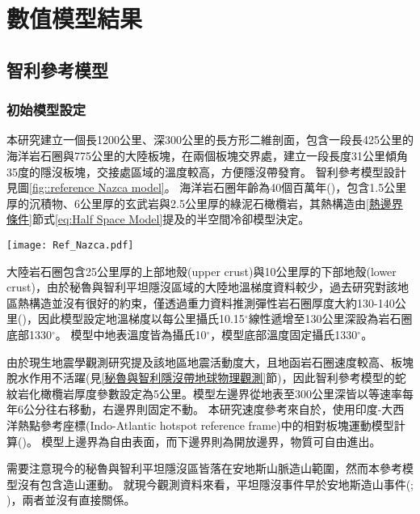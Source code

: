 
\chapter{數值模型結果}

\section{智利參考模型}
\subsection{初始模型設定}\label{智利參考模型初始模型設定}
本研究建立一個長1200公里、深300公里的長方形二維剖面，包含一段長425公里的海洋岩石圈與775公里的大陸板塊，在兩個板塊交界處，建立一段長度31公里傾角35度的隱沒板塊，交接處區域的溫度較高，方便隱沒帶發育。
智利參考模型設計見圖\ref{fig::reference Nazca model}。
海洋岩石圈年齡為40個百萬年(\citealp{muller2019})，包含1.5公里厚的沉積物、6公里厚的玄武岩與2.5公里厚的綠泥石橄欖岩，其熱構造由\ref{熱邊界條件}節式\ref{eq:Half Space Model}提及的半空間冷卻模型決定。

\begin{figure*}[hb]
    \centering
    \texttt{[image: Ref\_Nazca.pdf]}
    \caption[智利參考模型設計與邊界條件示意圖]{智利參考模型設計與邊界條件示意圖}
    \label{fig::reference Nazca model}
\end{figure*}

大陸岩石圈包含25公里厚的上部地殼(upper crust)與10公里厚的下部地殼(lower crust)，由於秘魯與智利平坦隱沒區域的大陸地溫梯度資料較少，過去研究對該地區熱構造並沒有很好的約束，僅透過重力資料推測彈性岩石圈厚度大約130-140公里(\citealp{perez2008})，因此模型設定地溫梯度以每公里攝氏10.15$^{\circ}$線性遞增至130公里深設為岩石圈底部1330$^{\circ}$。
模型中地表溫度皆為攝氏10$^{\circ}$，模型底部溫度固定攝氏1330$^{\circ}$。

由於現生地震學觀測研究提及該地區地震活動度大，且地函岩石圈速度較高、板塊脫水作用不活躍(見\ref{秘魯與智利隱沒帶地球物理觀測}節)，因此智利參考模型的蛇紋岩化橄欖岩厚度參數設定為5公里。模型左邊界從地表至300公里深皆以等速率每年6公分往右移動，右邊界則固定不動。
本研究速度參考來自於\citealp{o2005uncertainties}，使用印度-大西洋熱點參考座標(Indo-Atlantic hotspot reference frame)中的相對板塊運動模型計算(\citealp{schellart2008global})。
模型上邊界為自由表面，而下邊界則為開放邊界，物質可自由進出。

需要注意現今的秘魯與智利平坦隱沒區皆落在安地斯山脈造山範圍，然而本參考模型沒有包含造山運動。
就現今觀測資料來看，平坦隱沒事件早於安地斯造山事件(\citealp{chen2019southward}; \citealp{hu2021southward})，兩者並沒有直接關係。


